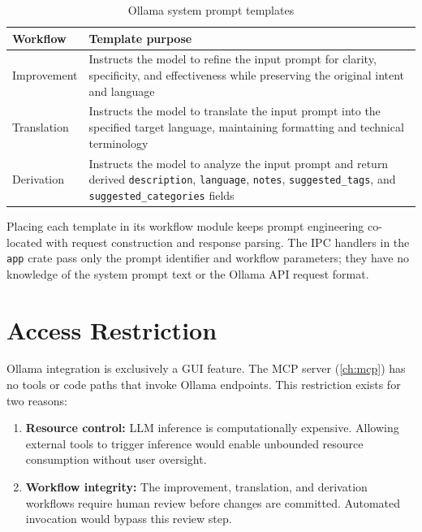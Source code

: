 \documentclass[a4paper, 11pt, oneside]{report}
\begin{document}
\begin{table}[H]
  \centering
  \caption{Ollama system prompt templates}
  \label{tab:ollama-templates}
  \begin{tabularx}{\textwidth}{l X}
    \toprule
    \textbf{Workflow} & \textbf{Template purpose} \\
    \midrule
    Improvement  & Instructs the model to refine the input prompt for
                   clarity, specificity, and effectiveness while
                   preserving the original intent and language \\
    Translation  & Instructs the model to translate the input prompt
                   into the specified target language, maintaining
                   formatting and technical terminology \\
    Derivation   & Instructs the model to analyze the input prompt and
                   return derived \texttt{description},
                   \texttt{language}, \texttt{notes}, \texttt{suggested\_tags}, and
                   \texttt{suggested\_categories} fields \\
    \bottomrule
  \end{tabularx}
\end{table}

Placing each template in its workflow module keeps prompt engineering
co-located with request construction and response parsing.  The IPC
handlers in the \texttt{app} crate pass only the prompt identifier and
workflow parameters; they have no knowledge of the system prompt text
or the Ollama API request format.

\section{Access Restriction}
\label{sec:ollama-access}

Ollama integration is exclusively a GUI feature.  The MCP server
(\cref{ch:mcp}) has no tools or code paths that invoke Ollama endpoints.
This restriction exists for two reasons:

\begin{enumerate}
  \item \textbf{Resource control:} LLM inference is computationally
        expensive.  Allowing external tools to trigger inference would
        enable unbounded resource consumption without user oversight.
  \item \textbf{Workflow integrity:} The improvement, translation, and
        derivation workflows require human review before changes are
        committed.  Automated invocation would bypass this review step.
\end{enumerate}
\end{document}
